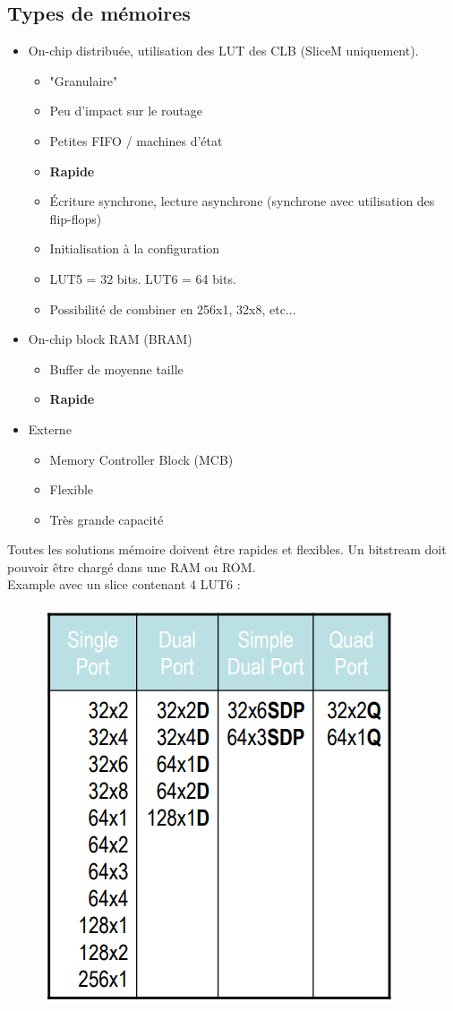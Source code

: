 \documentclass[resume]{subfiles}
\begin{document}
\subsection{Types de mémoires}
\begin{itemize}
\item On-chip distribuée, utilisation des LUT des CLB (SliceM uniquement).
\begin{itemize}
\item "Granulaire"
\item Peu d'impact sur le routage
\item Petites FIFO / machines d'état
\item \textbf{Rapide}
\item Écriture synchrone, lecture asynchrone (synchrone avec utilisation des flip-flops)
\item Initialisation à la configuration
\item LUT5 = 32 bits. LUT6 = 64 bits.
\item Possibilité de combiner en 256x1, 32x8, etc...
\end{itemize}
\item On-chip block RAM (BRAM)
\begin{itemize}
\item Buffer de moyenne taille
\item \textbf{Rapide}
\end{itemize}
\item Externe
\begin{itemize}
\item Memory Controller Block (MCB)
\item Flexible
\item Très grande capacité
\end{itemize}
\end{itemize}
Toutes les solutions mémoire doivent être rapides et flexibles. Un bitstream doit pouvoir être chargé dans une RAM ou ROM.\\
Example avec un slice contenant 4 LUT6 :
\begin{figure}[H]
\centering
\includegraphics[width=0.4\columnwidth]{img_1.png}
\end{figure}
\end{document}
